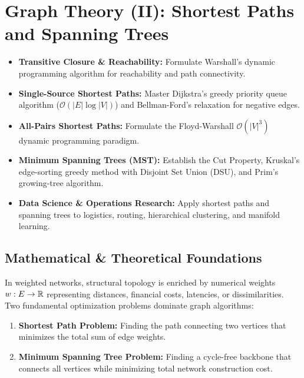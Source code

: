 \chapter{Graph Theory (II): Shortest Paths and Spanning Trees}

\begin{tcolorbox}[colback=primarylight, colframe=primarydark, title={\textbf{Executive Roadmap \& Learning Objectives}}]
\begin{itemize}
    \item \textbf{Transitive Closure \& Reachability:} Formulate Warshall's dynamic programming algorithm for reachability and path connectivity.
    \item \textbf{Single-Source Shortest Paths:} Master Dijkstra's greedy priority queue algorithm ($\mathcal{O}(|E| \log |V|)$) and Bellman-Ford's relaxation for negative edges.
    \item \textbf{All-Pairs Shortest Paths:} Formulate the Floyd-Warshall $\mathcal{O}(|V|^3)$ dynamic programming paradigm.
    \item \textbf{Minimum Spanning Trees (MST):} Establish the Cut Property, Kruskal's edge-sorting greedy method with Disjoint Set Union (DSU), and Prim's growing-tree algorithm.
    \item \textbf{Data Science \& Operations Research:} Apply shortest paths and spanning trees to logistics, routing, hierarchical clustering, and manifold learning.
\end{itemize}
\end{tcolorbox}

\section{Mathematical \& Theoretical Foundations}

In weighted networks, structural topology is enriched by numerical weights $w: E \to \mathbb{R}$ representing distances, financial costs, latencies, or dissimilarities. Two fundamental optimization problems dominate graph algorithms:
\begin{enumerate}
    \item \textbf{Shortest Path Problem:} Finding the path connecting two vertices that minimizes the total sum of edge weights.
    \item \textbf{Minimum Spanning Tree Problem:} Finding a cycle-free backbone that connects all vertices while minimizing total network construction cost.
\end{enumerate}

